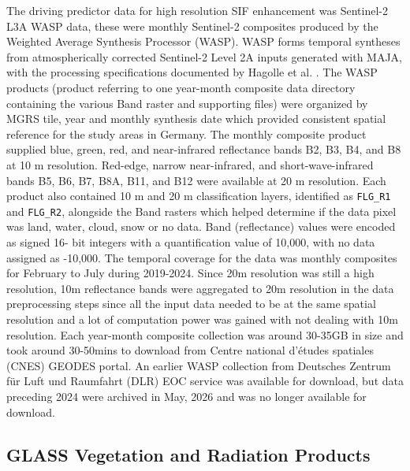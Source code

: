 The driving predictor data for high resolution SIF enhancement was Sentinel-2 L3A WASP data, these were monthly Sentinel-2 composites produced by the Weighted Average Synthesis Processor (WASP). WASP forms temporal syntheses from atmospherically corrected Sentinel-2 Level 2A inputs generated with MAJA, with the processing specifications documented by Hagolle et al. \cite{hagolle_maja_2017,hagolle_wasp_2018}. The WASP products (product referring to one year-month composite data directory containing the various Band raster and supporting files) were organized by MGRS tile, year and monthly synthesis date which provided consistent spatial reference for the study areas in Germany. The monthly composite product supplied blue, green, red, and near-infrared reflectance bands B2, B3, B4, and B8 at 10 m resolution. Red-edge, narrow near-infrared, and short-wave-infrared bands B5, B6, B7, B8A, B11, and B12 were available at 20 m resolution. Each product also contained 10 m and 20 m classification layers, identified as \texttt{FLG\_R1} and \texttt{FLG\_R2}, alongside the Band rasters which helped determine if the data pixel was land, water, cloud, snow or no data. Band (reflectance) values were encoded as signed 16- bit integers with a quantification value of 10,000, with no data assigned as -10,000. The temporal coverage for the data was monthly composites for February to July during 2019-2024. Since 20m resolution was still a high resolution, 10m reflectance bands were aggregated to 20m resolution in the data preprocessing steps since all the input data needed to be at the same spatial resolution and a lot of computation power was gained with not dealing with 10m resolution. Each year-month composite collection was around 30-35GB in size and took around 30-50mins to download from Centre national d'études spatiales (CNES) GEODES portal. An earlier WASP collection from Deutsches Zentrum für Luft und Raumfahrt (DLR) EOC service was available for download, but data preceding 2024 were archived in May, 2026 and was no longer available for download.

\subsection{GLASS Vegetation and Radiation Products}

